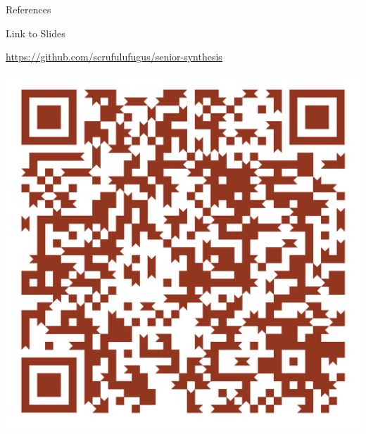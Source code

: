 \documentclass[aspectratio=169,t]{beamer}
\begin{document}
\begin{frame}[allowframebreaks,label=]{References}
\nocite{*}


\end{frame}

\begin{frame}[label={sec:orgb8c1222}]{Link to Slides}
\begin{center}
\url{https://github.com/scrufulufugus/senior-synthesis}

\includegraphics[height=0.70\textheight]{./Figs/qr.png}
\end{center}
\end{frame}
\end{document}
